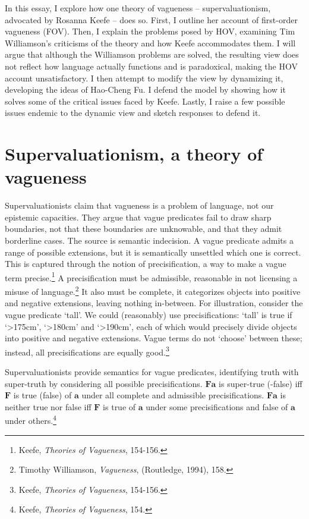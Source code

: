 In this essay, I explore how one theory of vagueness --
supervaluationism, advocated by Rosanna Keefe -- does so. First, I
outline her account of first-order vagueness (FOV). Then, I explain the
problems posed by HOV, examining Tim Williamson's criticisms of the
theory and how Keefe accommodates them. I will argue that although the
Williamson problems are solved, the resulting view does not reflect how
language actually functions and is paradoxical, making the HOV account
unsatisfactory. I then attempt to modify the view by dynamizing it,
developing the ideas of Hao-Cheng Fu. I defend the model by showing how
it solves some of the critical issues faced by Keefe. Lastly, I raise a
few possible issues endemic to the dynamic view and sketch responses to
defend it.

\section{Supervaluationism, a theory of vagueness}

Supervaluationists claim that vagueness is a problem of language, not
our epistemic capacities. They argue that vague predicates fail to draw
sharp boundaries, not that these boundaries are unknowable, and that
they admit borderline cases. The source is semantic indecision. A vague
predicate admits a range of possible extensions, but it is semantically
unsettled which one is correct. This is captured through the notion of
precisification, a way to make a vague term precise.\footnote{Keefe,
  \emph{Theories of Vagueness}, 154-156.} A precisification must be
admissible, reasonable in not licensing a misuse of language.\footnote{Timothy
  Williamson, \emph{Vagueness}, (Routledge, 1994), 158.} It also must be
complete, it categorizes objects into positive and negative extensions,
leaving nothing in-between. For illustration, consider the vague
predicate `tall'. We could (reasonably) use precisifications: `tall' is
true if `\textgreater175cm', `\textgreater180cm' and
`\textgreater190cm', each of which would precisely divide objects into
positive and negative extensions. Vague terms do not `choose' between
these; instead, all precisifications are equally good.\footnote{Keefe,
  \emph{Theories of Vagueness}, 154-156.}

Supervaluationists provide semantics for vague predicates, identifying
truth with super-truth by considering all possible precisifications.
$\mathbf{Fa}$ is super-true (-false) iff $\mathbf{F}$ is true (false) of
$\mathbf{a}$ under all complete and admissible precisifications.
$\mathbf{Fa}$ is neither true nor false iff $\mathbf{F}$ is true of
$\mathbf{a}$ under some precisifications and false of $\mathbf{a}$ under
others.\footnote{Keefe, \emph{Theories of Vagueness}, 154.}

